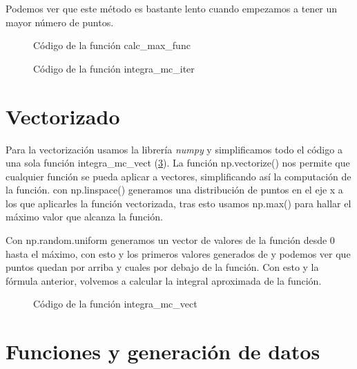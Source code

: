 \documentclass[6pt]{AiTex}
\begin{document}
Podemos ver que este método es bastante lento cuando empezamos a tener un mayor número de puntos.

\begin{figure}[H]
    \centering
    
    \caption{Código de la función calc\_max\_func}
    \label{fig:calc_max_func}
\end{figure}

\begin{figure}[H]
    \centering
    
    \caption{Código de la función integra\_mc\_iter}
    \label{fig:integra_mc_iter}
\end{figure}

\section{Vectorizado}

Para la vectorización usamos la librería \textit{numpy} y simplificamos todo el código a una sola función \textcolor{codepurple}{integra\_mc\_vect} (\ref{fig:integra_mc_vect}). La función \textcolor{codepurple}{np.vectorize()} nos permite que cualquier función se pueda aplicar a vectores, simplificando así la computación de la función. con \textcolor{codepurple}{np.linspace()} generamos una distribución de puntos en el eje x a los que aplicarles la función vectorizada, tras esto usamos \textcolor{codepurple}{np.max()} para hallar el máximo valor que alcanza la función.

Con \textcolor{codepurple}{np.random.uniform} generamos un vector de valores de la función desde 0 hasta el máximo, con esto y los primeros valores generados de y podemos ver que puntos quedan por arriba y cuales por debajo de la función. Con esto y la fórmula anterior, volvemos a calcular la integral aproximada de la función.

\begin{figure}[H]
    \centering
    
    \caption{Código de la función integra\_mc\_vect}
    \label{fig:integra_mc_vect}
\end{figure}

\section{Funciones y generación de datos}
\end{document}
